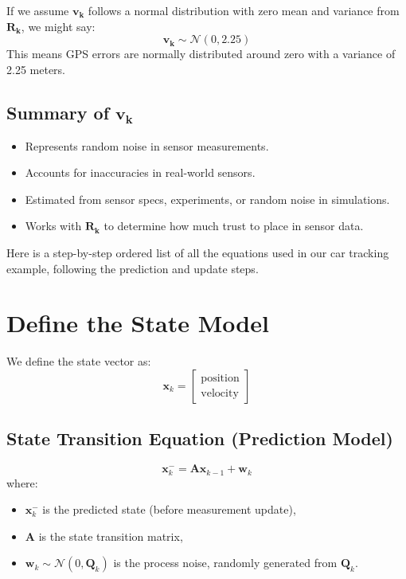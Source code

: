 \documentclass{article}
\begin{document}
If we assume \(\mathbf{v_k}\) follows a normal distribution with zero mean and variance from \(\mathbf{R_k}\), we might say:
\[
\mathbf{v_k} \sim \mathcal{N}(0, 2.25)
\]
This means GPS errors are normally distributed around zero with a variance of 2.25 meters.

\subsection*{Summary of \(\mathbf{v_k}\)}
\begin{itemize}
    \item Represents random noise in sensor measurements.
    \item Accounts for inaccuracies in real-world sensors.
    \item Estimated from sensor specs, experiments, or random noise in simulations.
    \item Works with \(\mathbf{R_k}\) to determine how much trust to place in sensor data.
\end{itemize}

\newpage

Here is a step-by-step ordered list of all the equations used in our car tracking example, following the prediction and update steps.

\section{Define the State Model}
We define the state vector as:
\[
\mathbf{x}_k =
\begin{bmatrix}
\text{position} \\
\text{velocity}
\end{bmatrix}
\]

\subsection{State Transition Equation (Prediction Model)}
\[
\mathbf{x}_k^- = \mathbf{A} \mathbf{x}_{k-1} + \mathbf{w}_k
\]
where:
\begin{itemize}
    \item $\mathbf{x}_k^-$ is the predicted state (before measurement update),
    \item $\mathbf{A}$ is the state transition matrix,
    \item $\mathbf{w}_k \sim \mathcal{N}(0, \mathbf{Q}_k)$ is the process noise, randomly generated from $\mathbf{Q}_k$.
\end{itemize}
\end{document}
